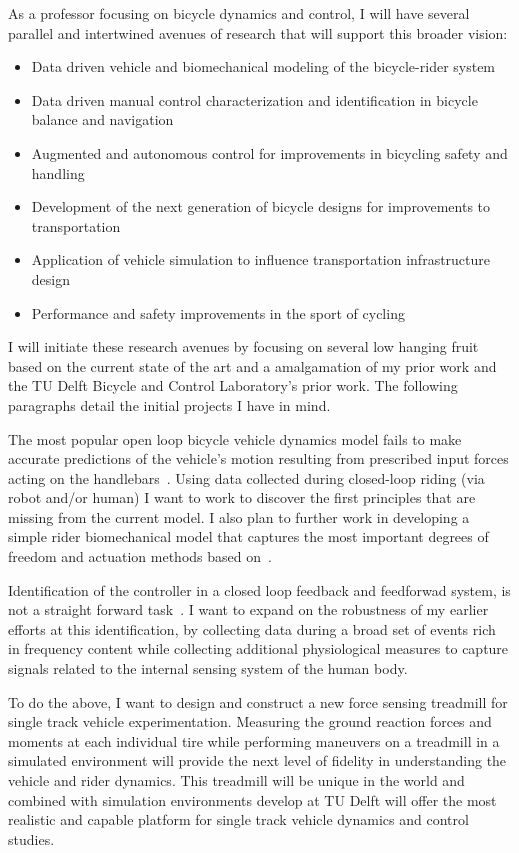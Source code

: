\documentclass{article}
\begin{document}
As a professor focusing on bicycle dynamics and control, I will have several
parallel and intertwined avenues of research that will support this broader
vision:
%
\begin{itemize}
  \item Data driven vehicle and biomechanical modeling of the bicycle-rider
    system
  \item Data driven manual control characterization and identification in
    bicycle balance and navigation
  \item Augmented and autonomous control for improvements in bicycling safety
    and handling
  \item Development of the next generation of bicycle designs for improvements
    to transportation
  \item Application of vehicle simulation to influence transportation
    infrastructure design
  \item Performance and safety improvements in the sport of cycling
\end{itemize}

I will initiate these research avenues by focusing on several low hanging fruit
based on the current state of the art and a amalgamation of my prior work and
the TU Delft Bicycle and Control Laboratory's prior work. The following
paragraphs detail the initial projects I have in mind.

The most popular open loop bicycle vehicle dynamics model fails to make
accurate predictions of the vehicle's motion resulting from prescribed input
forces acting on the handlebars~\cite{Moore2013a}. Using data collected during
closed-loop riding (via robot and/or human) I want to work to discover the
first principles that are missing from the current model. I also plan to
further work in developing a simple rider biomechanical model that captures the
most important degrees of freedom and actuation methods based
on~\cite{Moore2011}.

Identification of the controller in a closed loop feedback and feedforwad
system, is not a straight forward task~\cite{vanderKooij2005}. I want to expand
on the robustness of my earlier efforts at this identification, by collecting
data during a broad set of events rich in frequency content while collecting
additional physiological measures to capture signals related to the internal
sensing system of the human body.

To do the above, I want to design and construct a new force sensing treadmill
for single track vehicle experimentation. Measuring the ground reaction forces
and moments at each individual tire while performing maneuvers on a treadmill
in a simulated environment will provide the next level of fidelity in
understanding the vehicle and rider dynamics. This treadmill will be unique in
the world and combined with simulation environments develop at TU Delft will
offer the most realistic and capable platform for single track vehicle dynamics
and control studies.
\end{document}
